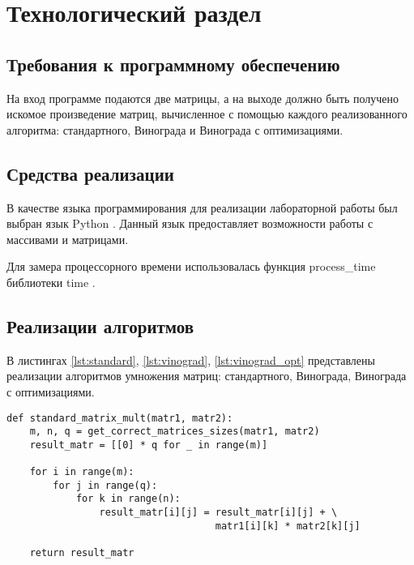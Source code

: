 \section{Технологический раздел \hfill}
\vspace{\baselineskip}

\subsection{Требования к программному обеспечению}

На вход программе подаются две матрицы, а на выходе должно быть получено искомое произведение матриц, вычисленное с помощью каждого реализованного алгоритма: стандартного, Винограда и Винограда с оптимизациями.

\subsection{Средства реализации}

В качестве языка программирования для реализации лабораторной работы был выбран язык Python \cite{PythonBook}. Данный язык предоставляет возможности работы с массивами и матрицами.

Для замера процессорного времени использовалась функция process\_time библиотеки time \cite{process_time_text}.


\subsection{Реализации алгоритмов}
В листингах \ref{lst:standard}, \ref{lst:vinograd}, \ref{lst:vinograd_opt} представлены реализации алгоритмов умножения матриц: стандартного, Винограда, Винограда с оптимизациями.
\newpage

\begin{lstlisting}[label=lst:standard, caption=Стандартный алгоритм умножения матриц]
def standard_matrix_mult(matr1, matr2):
    m, n, q = get_correct_matrices_sizes(matr1, matr2)
    result_matr = [[0] * q for _ in range(m)]
    
    for i in range(m):
        for j in range(q):
            for k in range(n):
                result_matr[i][j] = result_matr[i][j] + \ 
                                    matr1[i][k] * matr2[k][j]

    return result_matr
\end{lstlisting}
\newpage

